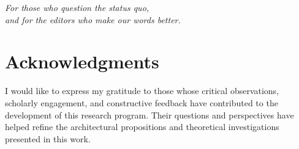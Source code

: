 \thispagestyle{empty}
\vspace*{1.2in}
\begin{center}
    \itshape
    For those who question the status quo,\\
    and for the editors who make our words better.
\end{center}
\vspace{0.65in}
\section*{Acknowledgments}
\noindent I would like to express my gratitude to those whose critical
observations, scholarly engagement, and constructive feedback have
contributed to the development of this research program. Their
questions and perspectives have helped refine the architectural
propositions and theoretical investigations presented in this work.\par
\clearpage
